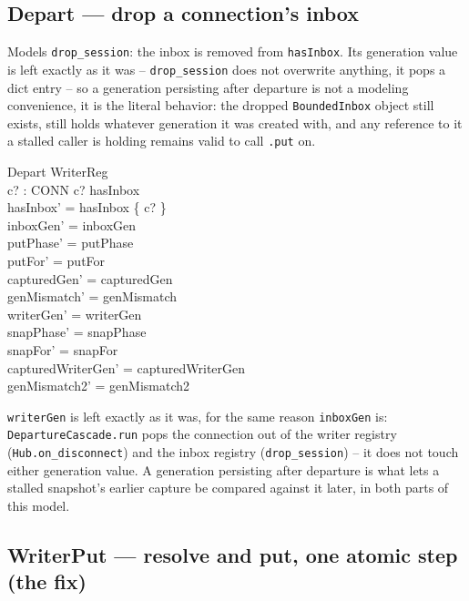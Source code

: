 \documentclass[a4paper,10pt,fleqn]{article}
\begin{document}
\subsection{Depart --- drop a connection's inbox}

Models \texttt{drop\_session}: the inbox is removed from \texttt{hasInbox}.
Its generation value is left exactly as it was -- \texttt{drop\_session}
does not overwrite anything, it pops a dict entry -- so a generation
persisting after departure is not a modeling convenience, it is the literal
behavior: the dropped \texttt{BoundedInbox} object still exists, still holds
whatever generation it was created with, and any reference to it a stalled
caller is holding remains valid to call \texttt{.put} on.

\begin{schema}{Depart}
  \Delta WriterReg \\
  c? : CONN
\where
  c? \in hasInbox \\
  hasInbox' = hasInbox \setminus \{ c? \} \\
  inboxGen' = inboxGen \\
  putPhase' = putPhase \\
  putFor' = putFor \\
  capturedGen' = capturedGen \\
  genMismatch' = genMismatch \\
  writerGen' = writerGen \\
  snapPhase' = snapPhase \\
  snapFor' = snapFor \\
  capturedWriterGen' = capturedWriterGen \\
  genMismatch2' = genMismatch2
\end{schema}

\texttt{writerGen} is left exactly as it was, for the same reason
\texttt{inboxGen} is: \texttt{DepartureCascade.run} pops the connection out
of the writer registry (\texttt{Hub.on\_disconnect}) and the inbox registry
(\texttt{drop\_session}) -- it does not touch either generation value. A
generation persisting after departure is what lets a stalled snapshot's
earlier capture be compared against it later, in both parts of this model.

\subsection{WriterPut --- resolve and put, one atomic step (the fix)}
\label{sec:writerput}
\end{document}
